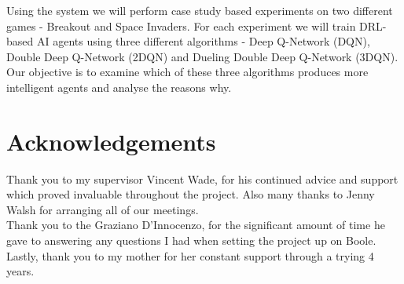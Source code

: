 \documentclass[a4paper,oneside,12pt]{book}
\begin{document}
Using the system we will perform case study based experiments on two different games - Breakout and Space Invaders. For each experiment we will train DRL-based AI agents using three different algorithms - Deep Q-Network (DQN), Double Deep Q-Network (2DQN) and Dueling Double Deep Q-Network (3DQN). Our objective is to examine which of these three algorithms produces more intelligent agents and analyse the reasons why.

\newpage
\onehalfspacing  %

\chapter*{Acknowledgements}
Thank you to my supervisor Vincent Wade, for his continued advice and support which proved invaluable throughout the project. Also many thanks to Jenny Walsh for arranging all of our meetings. \\

Thank you to the Graziano D'Innocenzo, for the significant amount of time he gave to answering any questions I had when setting the project up on Boole. \\

Lastly, thank you to my mother for her constant support through a trying 4 years.

\tableofcontents
\listoffigures
\listoftables
\newpage

\mainmatter







\appendix
\renewcommand{\thechapter}{A\arabic{chapter}}

\end{document}
